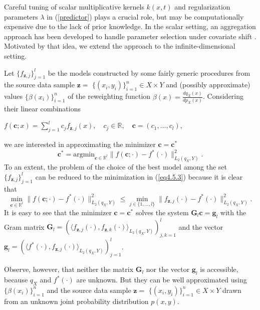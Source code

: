 \documentclass[twoside,11pt]{article}
\begin{document}
Careful tuning of scalar multiplicative kernels $k(x,t)$ and  regularization parameters $\lambda$ in (\ref{predictor}) plays a crucial role, but may be computationally expensive due to the lack of prior knowledge. In the scalar setting, an aggregation approach has been developed to handle parameter selection under covariate shift \cite{DBLP:conf/iclr/DinuHBNHEMPHZ23}. Motivated by that idea, we extend the approach \cite{DBLP:conf/iclr/DinuHBNHEMPHZ23} to the infinite-dimensional setting.

Let $\{f_{\mathbf{z},j}\}_{j=1}^{l}$ be the models constructed by some fairly generic procedures from the source data sample 
$\mathbf{z} =$ $\{(x_i, y_i)\}_{i=1}^n \in X \times Y$ and (possibly approximate) values $\{\beta(x_i)\}_{i=1}^n $ of the reweighting function  $\beta(x) = \frac{dq_X(x)}{dp_X(x)}$. Considering their linear combinations

\begin{center}
$    
 f(\mathbf{c};x) = \sum_{j=1}^l c_j f_{\mathbf{z},j}(x), \quad  c_j \in \mathbb{R}, \quad \mathbf{c} = (c_1,...,c_l),
$
\end{center}

we are interested in approximating the minimizer $\mathbf{c} =\mathbf{c}^*$
\begin{equation}\label{eq4.5.3}
  \mathbf{c}^*  = \text{argmin}_{\mathbf{c} \in \mathbb{R}^l } \big\|f(\mathbf{c};\cdot) - f^*(\cdot)\big\|^2_{L_2(q_X,Y)} .
\end{equation}
To an extent, the problem of the choice of the best model among the set $\{f_{\mathbf{z},j}\}_{j=1}^{l}$ can be reduced to the minimization in  (\ref{eq4.5.3}) because it is clear that 
\begin{equation}\label{eq4.5.4}
  \min_{\mathbf{c} \in \mathbb{R}^l } \big\|f(\mathbf{c};\cdot) - f^*(\cdot)\big\|^2_{L_2(q_X,Y)} \leq \min_{j\in \{1,...,l \}} \big\|f_{\mathbf{z},j}(\cdot) - f^*(\cdot)\big\|^2_{L_2(q_X,Y)} .
\end{equation}
It is easy to see that the minimizer $\mathbf{c} =\mathbf{c}^*$ solves the system $\mathbf{G}_l\mathbf{c} = \mathbf{g}_l$ with the Gram matrix $ \mathbf{G}_l = \left( \langle  f_{\mathbf{z},j}(\cdot),f_{\mathbf{z},k}(\cdot)\rangle_{L_2(q_X,Y)} \right)_{j,k=1}^l $ and the vector $\mathbf{g}_l = \left( \langle f^*(\cdot) ,f_{\mathbf{z},j}(\cdot)\rangle_{L_2(q_X,Y)} \right)_{j=1}^l $.

Observe, however, that neither the matrix $\mathbf{G}_l$ nor the vector $\mathbf{g}_l$ is accessible, because $q_X$ and $f^*(\cdot)$ are unknown. But they can be well approximated using $\{\beta(x_i)\}_{i=1}^n $ and the source data sample 
$\mathbf{z} =$ $\{(x_i, y_i)\}_{i=1}^n \in X \times Y$  drawn from an unknown joint probability distribution $p(x,y)$.
\end{document}
